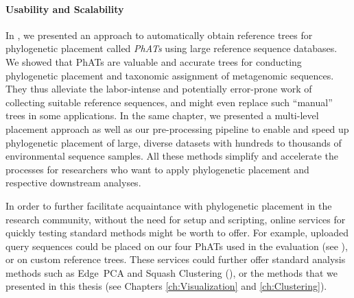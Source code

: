 \paragraph{Usability and Scalability}
\label{ch:ConclusionOutlook:par:UsabilityScalability}

In , we presented an approach to automatically obtain
reference trees for phylogenetic placement called \emph{\acfp{PhAT}} using large reference sequence databases.
We showed that \acp{PhAT} are valuable and accurate trees for
conducting phylogenetic placement and taxonomic assignment of metagenomic sequences.
They thus alleviate the labor-intense and potentially error-prone work of collecting suitable reference sequences,
and might even replace such ``manual'' trees in some applications.
In the same chapter, we presented a multi-level placement approach as well as our pre-processing pipeline
to enable and speed up phylogenetic placement
of large, diverse datasets with hundreds to thousands of environmental sequence samples.
All these methods simplify and accelerate the processes for researchers
who want to apply phylogenetic placement and respective downstream analyses.

In order to further facilitate acquaintance with phylogenetic placement in the research community,
without the need for setup and scripting, online services for quickly testing standard methods might be worth to offer.
For example, uploaded query sequences could be placed on our four \acp{PhAT} used in the evaluation
(see ),
or on custom reference trees.
These services could further offer standard analysis methods such as Edge~PCA and Squash Clustering
(),
or the methods that we presented in this thesis (see Chapters \ref{ch:Visualization} and \ref{ch:Clustering}).

